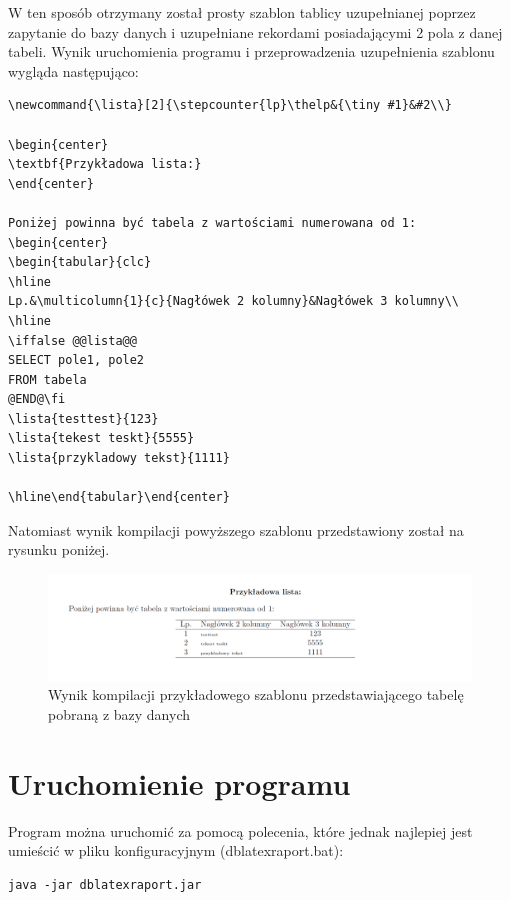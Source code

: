 W ten sposób otrzymany został prosty szablon tablicy uzupełnianej poprzez zapytanie do bazy danych i uzupełniane rekordami posiadającymi 2 pola z danej tabeli. Wynik uruchomienia programu i przeprowadzenia uzupełnienia szablonu wygląda następująco:
\begin{lstlisting}
\newcommand{\lista}[2]{\stepcounter{lp}\thelp&{\tiny #1}&#2\\}

\begin{center}
\textbf{Przykładowa lista:} 
\end{center}

Poniżej powinna być tabela z wartościami numerowana od 1:
\begin{center}
\begin{tabular}{clc}
\hline
Lp.&\multicolumn{1}{c}{Nagłówek 2 kolumny}&Nagłówek 3 kolumny\\
\hline
\iffalse @@lista@@
SELECT pole1, pole2
FROM tabela
@END@\fi
\lista{testtest}{123}
\lista{tekest teskt}{5555}
\lista{przykladowy tekst}{1111}

\hline\end{tabular}\end{center}
\end{lstlisting}

Natomiast wynik kompilacji powyższego szablonu przedstawiony został na rysunku poniżej.
\begin{figure}[h]
    \centering
    \label{fig:przykladszablon}
    \includegraphics[width=1\textwidth]{rys/instrukcja/szablon.png}
    \caption{Wynik kompilacji przykładowego szablonu przedstawiającego tabelę pobraną z bazy danych}
\end{figure}

\section{Uruchomienie programu}

Program można uruchomić za pomocą polecenia, które jednak najlepiej jest umieścić w pliku konfiguracyjnym (dblatexraport.bat):
\begin{lstlisting}
java -jar dblatexraport.jar
\end{lstlisting}

